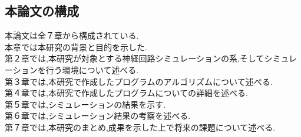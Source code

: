 \subsection{本論文の構成}

\indent 本論文は全７章から構成されている.\\
\indent 本章では本研究の背景と目的を示した.\\
\indent 第２章では,本研究が対象とする神経回路シミュレーションの系,そしてシミュレーションを行う環境について述べる.\\
\indent 第３章では,本研究で作成したプログラムのアルゴリズムについて述べる.\\
\indent 第４章では,本研究で作成したプログラムについての詳細を述べる.\\
\indent 第５章では,シミュレーションの結果を示す.\\
\indent 第６章では,シミュレーション結果の考察を述べる.\\
\indent 第７章では,本研究のまとめ,成果を示した上で将来の課題について述べる.\\
